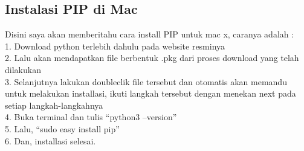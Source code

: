 \documentclass[12pt,a4paper]{article}
\begin{document}
\subsection{Instalasi PIP di Mac}
Disini saya akan memberitahu cara install PIP untuk mac x, caranya adalah : \\
1.	Download python terlebih dahulu pada website resminya \\
2.	Lalu akan mendapatkan file berbentuk .pkg  dari proses download yang telah dilakukan \\
3.	Selanjutnya lakukan doubleclik file tersebut dan otomatis akan memandu untuk melakukan installasi, ikuti langkah tersebut dengan menekan next pada setiap langkah-langkahnya \\
4.	Buka terminal dan tulis “python3 –version” \\
5.	Lalu, “sudo easy install pip” \\
6.	Dan, installasi selesai. \\
\end{document}
